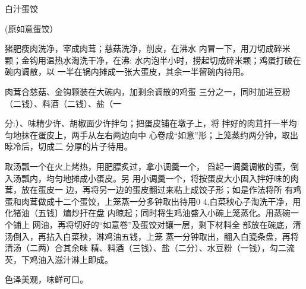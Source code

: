 \begin{recipe}{白汁蛋饺}

(原如意蛋饺）

\ingredients



\cooking

\step 	猪肥瘦肉洗净，宰成肉茸；慈菇洗净，削皮，在沸水 内冒一下，用刀切成碎米颗；金钩用温热水淘洗干净，在沸: 水内泡半小时，捞起切成碎米颗；鸡蛋打破在碗内调散，以 一半在锅内摊成一张大蛋皮，其余一半留碗内待用。

\step 	肉茸合慈菇、金钩颗装在大碗内，加剩余调散的鸡蛋 三分之一，同时加进豆粉（二钱）、料酒（二钱）、盐（一

分:）、味精少许、胡椒面少许拌匀；把蛋皮铺在墩子上，将 拌好的肉茸扞一半均匀地抹在蛋皮上，两手从左右两边向中 心卷成“如意”形；上笼蒸约两分钟，取出晾冷后，切成二 分厚的片子待用。

\step 取汤瓢一个在火上烤热，用肥膘炙过，拿小调羹一个， 舀起一调羹调散的蛋，倒入汤瓢内，均匀地摊成小蛋皮。另 用小调羹一个，将按蛋皮大小固入拌好味的肉茸，放在蛋皮一 边，再将另一边的蛋皮翻过来粘上成饺子形；如是作法将所 有鸡蛋和肉茸做成十二个蛋饺，上笼蒸一分多钟取出待用0 4,白菜秧心子淘洗干净，用化猪油（五钱〕煸炒扞在盘 内晾起；同时将生鸡油盛入小碗上笼蒸化。用蒸碗一个铺上 网油，再将切好的“如意卷”及蛋饺对镶一层，剩下材料全 部放在碗底，清汤倒入，再拈入白菜秧，淋鸡油五钱，上笼 蒸一分钟取出，翻入白瓷条盘，再将清汤（二两）合其余味 精、料酒（三钱）、盐（二分）、水豆粉（一钱），勾二流 芡，下鸡油入滋汁淋上即成。

\notes

色泽美观，味鲜可口。

\end{recipe}

